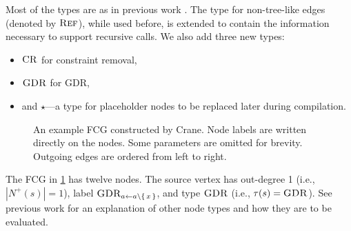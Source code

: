Most of the types are as in previous work
\citep{DBLP:conf/nips/Broeck11,DBLP:conf/ijcai/BroeckTMDR11}. The type for
non-tree-like edges (denoted by $\operatorname{\textsc{Ref}}$), while used before, is extended to
contain the information necessary to support recursive calls. We also add three
new types:
\begin{itemize}
  \item $\operatorname{\textsc{CR}}$ for constraint removal,
  \item $\operatorname{\textsc{GDR}}$ for GDR,
  \item and $\star$---a type for placeholder nodes to be replaced later during
        compilation.
\end{itemize}

\begin{figure}[t]
  \centering
  \caption{An example FCG constructed by Crane. Node labels are written directly
    on the nodes. Some parameters are omitted for brevity. Outgoing edges are
    ordered from left to right.}
  \label{fig:examplefcg}
\end{figure}

\begin{example}
  The FCG in \cref{fig:examplefcg} has twelve nodes. The source vertex has
  out-degree 1 (i.e., $|N^+(s)| = 1$), label
  $\operatorname{\textsc{GDR}}_{a \gets a \setminus \{\, x \,\}}$, and type $\operatorname{\textsc{GDR}}$ (i.e.,
  $\tau(s) = \operatorname{\textsc{GDR}}$). See previous work \citep{DBLP:conf/ijcai/BroeckTMDR11} for
  an explanation of other node types and how they are to be evaluated.
\end{example}

